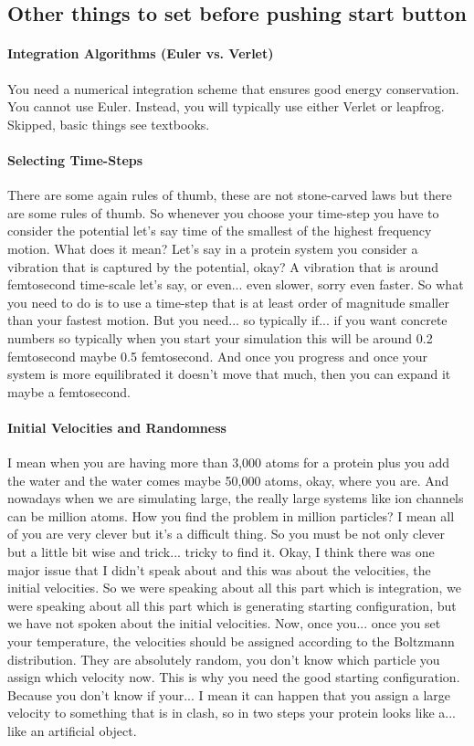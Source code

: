 \subsection{Other things to set before pushing start button}

\paragraph{Integration Algorithms (Euler vs. Verlet)} You need a numerical integration scheme that ensures good energy conservation. You cannot use Euler. Instead, you will typically use either Verlet or leapfrog. Skipped, basic things see textbooks.

\paragraph{Selecting Time-Steps}
There are some again rules of thumb, these are not stone-carved laws but there are some rules of thumb. So whenever you choose your time-step you have to consider the potential let's say time of the smallest of the highest frequency motion. What does it mean? Let's say in a protein system you consider a vibration that is captured by the potential, okay? A vibration that is around femtosecond time-scale let’s say, or even... even slower, sorry even faster. So what you need to do is to use a time-step that is at least order of magnitude smaller than your fastest motion. But you need... so typically if... if you want concrete numbers so typically when you start your simulation this will be around 0.2 femtosecond maybe 0.5 femtosecond. And once you progress and once your system is more equilibrated it doesn't move that much, then you can expand it maybe a femtosecond.

\paragraph{Initial Velocities and Randomness}
 I mean when you are having more than 3,000 atoms for a protein plus you add the water and the water comes maybe 50,000 atoms, okay, where you are. And nowadays when we are simulating large, the really large systems like ion channels can be million atoms. How you find the problem in million particles? I mean all of you are very clever but it's a difficult thing. So you must be not only clever but a little bit wise and trick... tricky to find it. Okay, I think there was one major issue that I didn't speak about and this was about the velocities, the initial velocities. So we were speaking about all this part which is integration, we were speaking about all this part which is generating starting configuration, but we have not spoken about the initial velocities. Now, once you... once you set your temperature, the velocities should be assigned according to the Boltzmann distribution. They are absolutely random, you don't know which particle you assign which velocity now. This is why you need the good starting configuration. Because you don't know if your... I mean it can happen that you assign a large velocity to something that is in clash, so in two steps your protein looks like a... like an artificial object.

